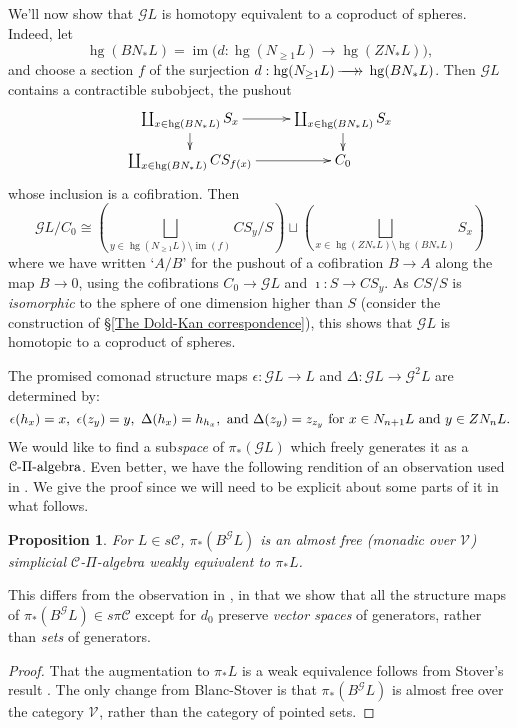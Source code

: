 \documentclass[11pt]{amsart} \renewcommand{\baselinestretch}{1.2}
\theoremstyle{plain}
\newtheorem{prop}[thm]{Proposition}
\theoremstyle{definition}
\DeclareMathOperator{\im}{im}
\DeclareMathOperator{\homog}{hg}
\renewcommand{\to}{\longrightarrow}
\newcommand{\scrG}{\mathscr{G}}
\newcommand{\calV}{\mathcal{V}}
\newcommand{\calc}{\mathcal{C}}
\newcommand{\citeBOX}[2][]{\cite[\mbox{#1}]{#2}}
\newcommand{\vect}[2]{\calV^{#1}_{#2}}
\newcommand{\BSW}{{\scrG}}
\newcommand{\PA}[1]{\pi#1}
\newcommand{\epi}{{\,\makebox[0cm][l]{\ensuremath\to}\to{}}}
\begin{document}
\begin{Composite functor spectral sequences}
We'll now show that $\BSW L$ is homotopy equivalent to a coproduct of spheres. Indeed,  let \[\homog(BN_*L)=\im \bigl(d:\homog(N_{\geq1}L)\to \homog(ZN_*L)\bigr),\]
 and choose a section $f$ of the surjection $d:\homog(N_{\geq1}L)\epi \homog(BN_*L)$. Then $\BSW L$ contains a contractible subobject, the pushout
\[\xymatrix@R=4mm{
\coprod_{x\in \homog(BN_*L)}S_{ x}
\ar[r]\ar[d]%
&%
\coprod_{x\in \homog(BN_*L)}S_{ x}\ar[d]\\%
\coprod_{x\in \homog(BN_*L)}CS_{ f(x)}
\ar[r]&%
C_0%
}\]
whose inclusion is a cofibration.  Then
\[\BSW L/C_0 \cong \left(\bigsqcup_{y\in \homog(N_{\geq1}L)\setminus\im (f)}CS_{ y}/S\right) \sqcup\left(\bigsqcup_{x\in \homog(ZN_*L)\setminus \homog(BN_*L)}S_{ x}\right)\]
where we have written `$A/B$' for the pushout of a cofibration $B\to A$ along the map $B\to0$, using the cofibrations $C_0\to \BSW L$ and $\imath:S\to CS_{ y}$.
As $CS/S$ is \emph{isomorphic} to the  sphere of one dimension higher than $S$ (consider the construction of \S\ref{The Dold-Kan correspondence}), this shows that $\BSW L$ is homotopic to a coproduct of spheres.

The promised comonad structure maps $\epsilon:\BSW L\to L$ and $\Delta:\BSW L\to \BSW^2L$ are determined by:
\[\epsilon(h_x)=x,\ \epsilon(z_y)=y,\ \Delta(h_x)=h_{h_x},\textup{ and }\Delta(z_y)=z_{z_y}\textup{ for $x\in N_{n+1}L$ and $y\in ZN_nL$.}\]
We would like to find a sub\emph{space} of $\pi_*(\BSW L)$ which freely generates it as a $\calc\textup{-$\Pi$-algebra}$. Even better, we have the following rendition of an observation used in  \cite[Proof of theorem 4.2]{Blanc_Stover-Groth_SS.pdf}. We give the proof since we will need to be explicit about some parts of it in what follows.
\begin{prop}
\label{Id of E2 grothen}
For $L\in s\calc$, $\pi_*(B^{\BSW}L)$ is an almost free (monadic over $\vect{}{}$) simplicial $\calc$-$\Pi$-algebra weakly equivalent to $\pi_*L$.
\end{prop}
\noindent This differs from the observation in \cite[Proof of theorem 4.2]{Blanc_Stover-Groth_SS.pdf}, in that we show that all the structure maps of $\pi_*(B^{\BSW}L)\in s\PA{\calc}$ except for $d_0$ preserve \emph{vector spaces} of generators, rather than \emph{sets} of generators.
\begin{proof}
That the augmentation to $\pi_*L$ is a weak equivalence follows from Stover's result \citeBOX[2.7]{StoverVanKampen.pdf}. The only change from Blanc-Stover is that $\pi_*(B^{\BSW}L)$ is almost free over the category $\vect{}{}$, rather than the category of pointed sets.


\end{proof}
\end{Composite functor spectral sequences}
\end{document}
